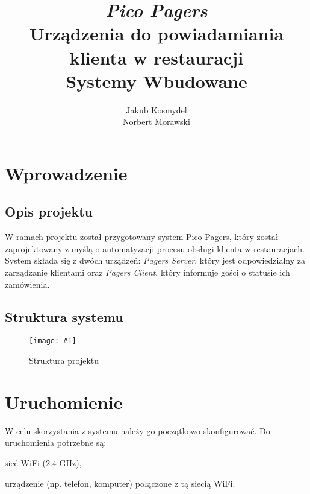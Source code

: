 \documentclass[12pt]{article}
\let\tempone\itemize
\let\temptwo\enditemize
\renewenvironment{itemize}{\tempone\setlength{\itemsep}{0cm}}{\temptwo}
\newcommand{\imgcustomsize}[3]{
	\begin{figure}[H]
		\centering
		\texttt{[image: \#1]}
		\caption{#2}
	\end{figure}
}
\newcommand{\img}[2]{\imgcustomsize{#1}{#2}{0.8}}
\begin{document}
	
	\title{\textit{Pico Pagers} \\ Urządzenia do powiadamiania klienta w restauracji \\
		\vspace{0.2cm}
		\large Systemy Wbudowane}
	\author{Jakub Kosmydel \\
		Norbert Morawski}
	
	\maketitle
	\tableofcontents
	\pagebreak
	
	
	\section{Wprowadzenie}
    \subsection{Opis projektu}
		W ramach projektu został przygotowany system Pico Pagers, który został zaprojektowany z myślą o automatyzacji procesu obsługi klienta w restauracjach. System składa się z dwóch urządzeń: \emph{Pagers Server}, który jest odpowiedzialny za zarządzanie klientami oraz \emph{Pagers Client}, który informuje gości o statusie ich zamówienia.
    \subsection{Struktura systemu}
    \img{graphs/structure}{Struktura projektu}

    \section{Uruchomienie}
        W celu skorzystania z systemu należy go początkowo skonfigurować. Do uruchomienia potrzebne są:
        \begin{itemize}
            \item sieć WiFi (2.4 GHz),
            \item urządzenie (np. telefon, komputer) połączone z tą siecią WiFi.
        \end{itemize}
\end{document}
